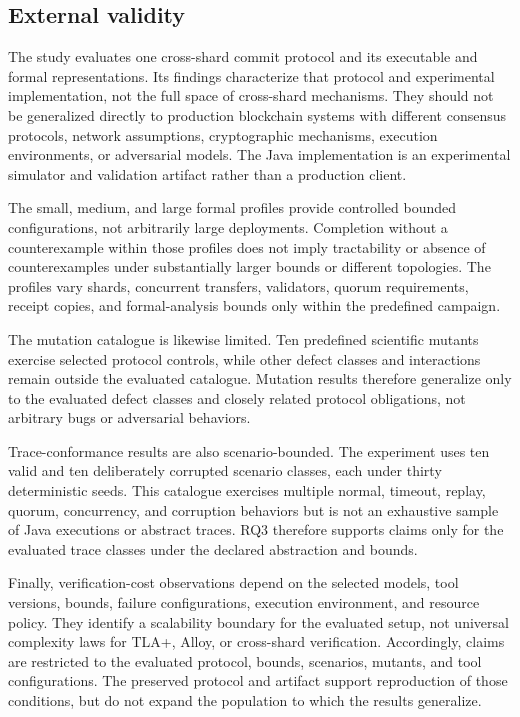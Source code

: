 \subsection{External validity}
\label{subsec:external-validity}

The study evaluates one cross-shard commit protocol and its executable and
formal representations. Its findings characterize that protocol and
experimental implementation, not the full space of cross-shard mechanisms.
They should not be generalized directly to production blockchain systems with
different consensus protocols, network assumptions, cryptographic mechanisms,
execution environments, or adversarial models. The Java implementation is an
experimental simulator and validation artifact rather than a production
client.

The small, medium, and large formal profiles provide controlled bounded
configurations, not arbitrarily large deployments. Completion without a
counterexample within those profiles does not imply tractability or absence of
counterexamples under substantially larger bounds or different topologies. The
profiles vary shards, concurrent transfers, validators, quorum requirements,
receipt copies, and formal-analysis bounds only within the predefined campaign.

The mutation catalogue is likewise limited. Ten predefined scientific mutants
exercise selected protocol controls, while other defect classes and
interactions remain outside the evaluated catalogue. Mutation results therefore
generalize only to the evaluated defect classes and closely related protocol
obligations, not arbitrary bugs or adversarial behaviors.

Trace-conformance results are also scenario-bounded. The experiment uses ten
valid and ten deliberately corrupted scenario classes, each under thirty
deterministic seeds. This catalogue exercises multiple normal, timeout, replay,
quorum, concurrency, and corruption behaviors but is not an exhaustive sample
of Java executions or abstract traces. RQ3 therefore supports claims only for the evaluated trace
classes under the declared abstraction and bounds.

Finally, verification-cost observations depend on the selected models, tool
versions, bounds, failure configurations, execution environment, and resource
policy. They identify a scalability boundary for the evaluated setup, not
universal complexity laws for TLA+, Alloy, or cross-shard verification.
Accordingly, claims are restricted to the evaluated protocol, bounds,
scenarios, mutants, and tool configurations. The preserved protocol and
artifact support reproduction of those conditions, but do not expand the
population to which the results generalize.

